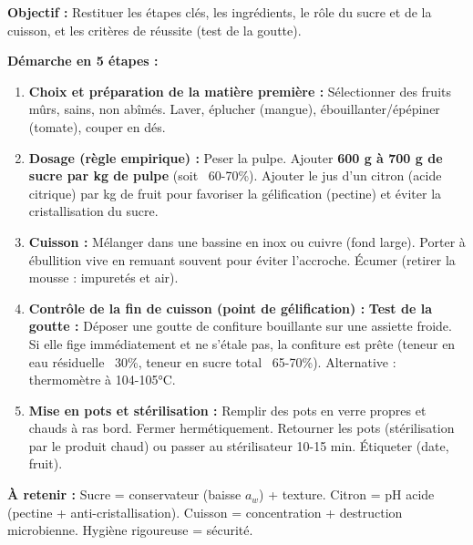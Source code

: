 \documentclass[11pt]{article}
\begin{document}
\begin{methode}
\textbf{Objectif :} Restituer les étapes clés, les ingrédients, le rôle du sucre et de la cuisson, et les critères de réussite (test de la goutte).\par
\textbf{Démarche en 5 étapes :}
\begin{enumerate}
    \item \textbf{Choix et préparation de la matière première :} Sélectionner des fruits mûrs, sains, non abîmés. Laver, éplucher (mangue), ébouillanter/épépiner (tomate), couper en dés.
    \item \textbf{Dosage (règle empirique) :} Peser la pulpe. Ajouter \textbf{600 g à 700 g de sucre par kg de pulpe} (soit ~60-70\%). Ajouter le jus d'un citron (acide citrique) par kg de fruit pour favoriser la gélification (pectine) et éviter la cristallisation du sucre.
    \item \textbf{Cuisson :} Mélanger dans une bassine en inox ou cuivre (fond large). Porter à ébullition vive en remuant souvent pour éviter l'accroche. Écumer (retirer la mousse : impuretés et air).
    \item \textbf{Contrôle de la fin de cuisson (point de gélification) :} \textbf{Test de la goutte :} Déposer une goutte de confiture bouillante sur une assiette froide. Si elle fige immédiatement et ne s'étale pas, la confiture est prête (teneur en eau résiduelle ~30\%, teneur en sucre total ~65-70\%). Alternative : thermomètre à 104-105°C.
    \item \textbf{Mise en pots et stérilisation :} Remplir des pots en verre propres et chauds à ras bord. Fermer hermétiquement. Retourner les pots (stérilisation par le produit chaud) ou passer au stérilisateur 10-15 min. Étiqueter (date, fruit).
\end{enumerate}
\textbf{À retenir :} Sucre = conservateur (baisse $a_w$) + texture. Citron = pH acide (pectine + anti-cristallisation). Cuisson = concentration + destruction microbienne. Hygiène rigoureuse = sécurité.
\end{methode}
\end{document}
